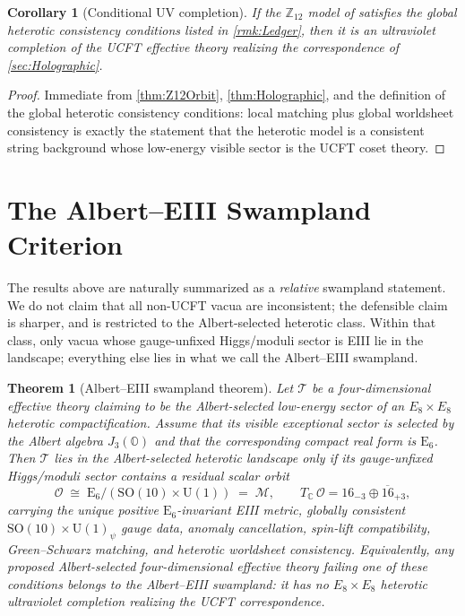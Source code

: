 \documentclass[pdflatex,sn-mathphys-num]{sn-jnl}
\theoremstyle{thmstyleone}
\newtheorem{theorem}{Theorem}
\newtheorem{corollary}[corollary]{Corollary}
\theoremstyle{thmstyletwo}%
\theoremstyle{thmstylethree}%
\newcommand{\SO}[1]{\mathrm{SO(#1)}}
\newcommand{\U}[1]{\mathrm{U(#1)}}
\newcommand{\E}[1]{\mathrm{E_{#1}}}
\newcommand{\M}{\mathcal{M}}
\newcommand{\jalg}{J_3(\mathbb{O})}
\newcommand{\SOTen}{\SO{10}}
\newcommand{\UOne}{\U{1}}
\newcommand{\ESix}{\E{6}}
\newcommand{\SOTenXUOne}{\SOTen \times \UOne}
\newcommand{\MCosetInline}{\ESix/(\SOTenXUOne)}
\begin{document}
\begin{corollary}[Conditional UV completion]
\label{cor:UVComplete}
If the $\mathbb Z_{12}$ model of \cite{Z12Heterotic} satisfies the global
heterotic consistency conditions listed in \autoref{rmk:Ledger}, then it is an
ultraviolet completion of the UCFT effective theory realizing the correspondence
of \autoref{sec:Holographic}.
\end{corollary}

\begin{proof}
Immediate from \autoref{thm:Z12Orbit}, \autoref{thm:Holographic}, and the
definition of the global heterotic consistency conditions: local matching plus
global worldsheet consistency is exactly the statement that the heterotic model
is a consistent string background whose low-energy visible sector is the UCFT
coset theory.
\end{proof}


\section{The Albert--EIII Swampland Criterion}
\label{sec:Swampland}

The results above are naturally summarized as a \emph{relative} swampland
statement.  We do not claim that all non-UCFT vacua are inconsistent; the
defensible claim is sharper, and is restricted to the Albert-selected heterotic
class.  Within that class, only vacua whose gauge-unfixed Higgs/moduli sector is
EIII lie in the landscape; everything else lies in what we call the
Albert--EIII swampland.

\begin{theorem}[Albert--EIII swampland theorem]
\label{thm:Swampland}
Let $\mathcal T$ be a four-dimensional effective theory claiming to be the
Albert-selected low-energy sector of an $E_{8}\times E_{8}$ heterotic
compactification.  Assume that its visible exceptional sector is selected by the
Albert algebra $\jalg$ and that the corresponding compact real form is $\ESix$.
Then $\mathcal T$ lies in the Albert-selected heterotic landscape only if its
gauge-unfixed Higgs/moduli sector contains a residual scalar orbit
\[
  \mathcal O\;\cong\;\MCosetInline\;=\;\M,
  \qquad
  T_{\mathbb C}\,\mathcal O=16_{-3}\oplus\overline{16}_{+3},
\]
carrying the unique positive $\ESix$-invariant EIII metric, globally consistent
$\SOTenXUOne_\psi$ gauge data, anomaly cancellation, spin-lift compatibility,
Green--Schwarz matching, and heterotic worldsheet consistency.  Equivalently, any
proposed Albert-selected four-dimensional effective theory failing one of these
conditions belongs to the Albert--EIII swampland: it has no
$E_{8}\times E_{8}$ heterotic ultraviolet completion realizing the UCFT
correspondence.
\end{theorem}
\end{document}

